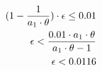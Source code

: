 \begin{equation}
        \begin{split}
                (1-\frac{1}{a_1 \cdot \theta}) \cdot \epsilon \leq 0.01 \\
                \epsilon < \frac{0.01 \cdot a_1 \cdot \theta}{a_1 \cdot \theta - 1} \\
                \epsilon < 0.0116
        \end{split}
\end{equation}





        


